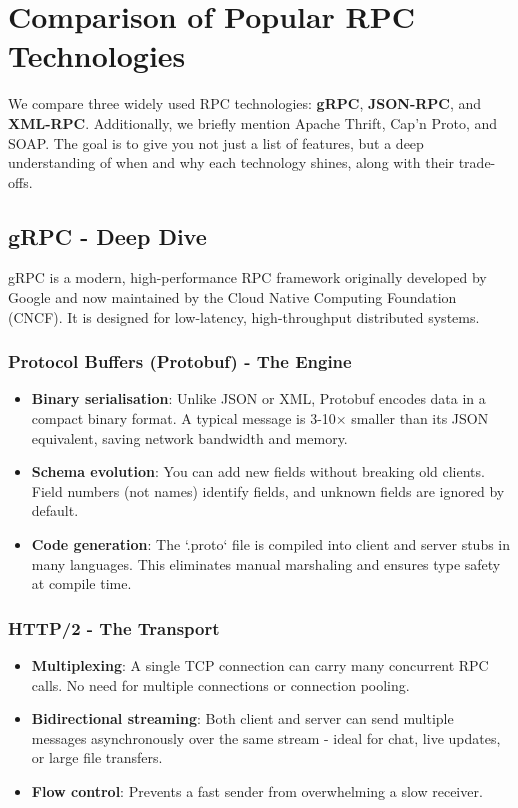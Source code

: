 \documentclass[10pt,a4paper]{article}
\begin{document}
\section{Comparison of Popular RPC Technologies}

We compare three widely used RPC technologies: \textbf{gRPC}, \textbf{JSON-RPC}, and \textbf{XML-RPC}. Additionally, we briefly mention Apache Thrift, Cap’n Proto, and SOAP. The goal is to give you not just a list of features, but a deep understanding of when and why each technology shines, along with their trade-offs.

\subsection{gRPC - Deep Dive}
gRPC is a modern, high-performance RPC framework originally developed by Google and now maintained by the Cloud Native Computing Foundation (CNCF). It is designed for low-latency, high-throughput distributed systems.

\subsubsection{Protocol Buffers (Protobuf) - The Engine}
\begin{itemize}
    \item \textbf{Binary serialisation}: Unlike JSON or XML, Protobuf encodes data in a compact binary format. A typical message is 3-10× smaller than its JSON equivalent, saving network bandwidth and memory.
    \item \textbf{Schema evolution}: You can add new fields without breaking old clients. Field numbers (not names) identify fields, and unknown fields are ignored by default.
    \item \textbf{Code generation}: The `.proto` file is compiled into client and server stubs in many languages. This eliminates manual marshaling and ensures type safety at compile time.
\end{itemize}

\subsubsection{HTTP/2 - The Transport}
\begin{itemize}
    \item \textbf{Multiplexing}: A single TCP connection can carry many concurrent RPC calls. No need for multiple connections or connection pooling.
    \item \textbf{Bidirectional streaming}: Both client and server can send multiple messages asynchronously over the same stream - ideal for chat, live updates, or large file transfers.
    \item \textbf{Flow control}: Prevents a fast sender from overwhelming a slow receiver.
\end{itemize}
\end{document}
